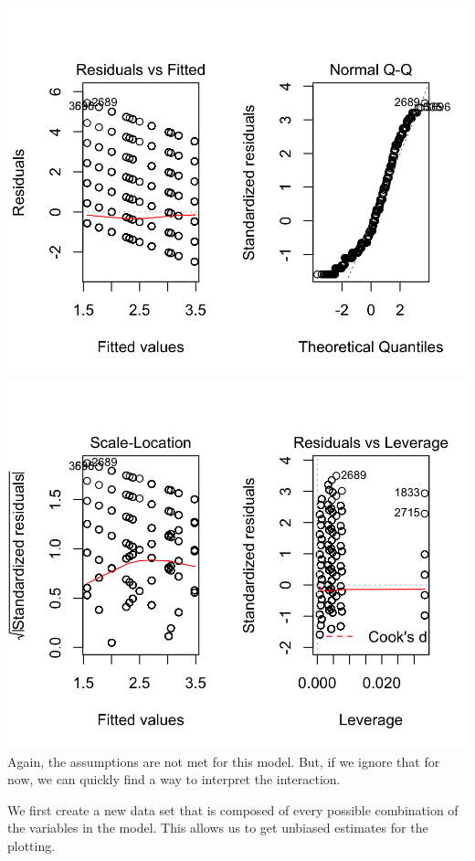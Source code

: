 \documentclass[]{tufte-book}
\newenvironment{Shaded}{}{}
\newcommand{\KeywordTok}[1]{\textcolor[rgb]{0.00,0.44,0.13}{\textbf{#1}}}
\newcommand{\DataTypeTok}[1]{\textcolor[rgb]{0.56,0.13,0.00}{#1}}
\newcommand{\StringTok}[1]{\textcolor[rgb]{0.25,0.44,0.63}{#1}}
\newcommand{\OperatorTok}[1]{\textcolor[rgb]{0.40,0.40,0.40}{#1}}
\newcommand{\NormalTok}[1]{#1}
\theoremstyle{definition}
\theoremstyle{definition}
\theoremstyle{remark}
\begin{document}
\includegraphics{_main_files/figure-latex/unnamed-chunk-77-1}
\includegraphics{_main_files/figure-latex/unnamed-chunk-77-2} Again, the
assumptions are not met for this model. But, if we ignore that for now,
we can quickly find a way to interpret the interaction.

We first create a new data set that is composed of every possible
combination of the variables in the model. This allows us to get
unbiased estimates for the plotting.

\begin{Shaded}
\end{Shaded}
\end{document}
